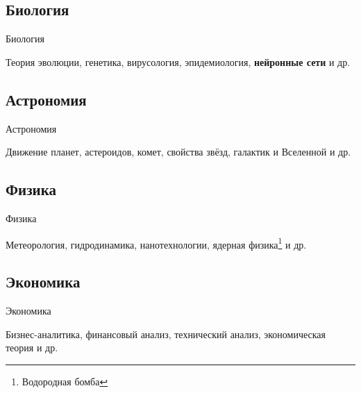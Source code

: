\documentclass[compress,red]{beamer}
\begin{document}
\subsection{Биология}
\begin{frame}
  \begin{center}
    \Huge{Биология}
  \end{center}
  \begin{center}
    \Large{Теория эволюции, генетика, вирусология, эпидемиология, \textbf{нейронные сети} и др.}
  \end{center}
\end{frame}

\subsection{Астрономия}
\begin{frame}
  \begin{center}
    \Huge{Астрономия}
  \end{center}
  \begin{center}
    \Large{Движение планет, астероидов, комет, свойства звёзд, галактик и Вселенной и др.}
  \end{center}
\end{frame}

\subsection{Физика}
\begin{frame}
  \begin{center}
    \Huge{Физика}
  \end{center}
  \begin{center}
    \Large{Метеорология, гидродинамика, нанотехнологии, ядерная физика\footnote{Водородная бомба} и др.}
  \end{center}
\end{frame}

\subsection{Экономика}
\begin{frame}
  \begin{center}
    \Huge{Экономика}
  \end{center}
  \begin{center}
    \Large{Бизнес-аналитика, финансовый анализ, технический анализ, экономическая теория и др.}
  \end{center}
\end{frame}
\end{document}
